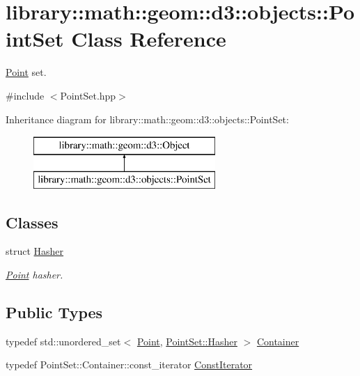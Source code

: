 \hypertarget{classlibrary_1_1math_1_1geom_1_1d3_1_1objects_1_1_point_set}{}\section{library\+:\+:math\+:\+:geom\+:\+:d3\+:\+:objects\+:\+:Point\+Set Class Reference}
\label{classlibrary_1_1math_1_1geom_1_1d3_1_1objects_1_1_point_set}


\hyperlink{classlibrary_1_1math_1_1geom_1_1d3_1_1objects_1_1_point}{Point} set.  




{\ttfamily \#include $<$Point\+Set.\+hpp$>$}

Inheritance diagram for library\+:\+:math\+:\+:geom\+:\+:d3\+:\+:objects\+:\+:Point\+Set\+:\begin{figure}[H]
\begin{center}
\leavevmode
\includegraphics[height=2.000000cm]{classlibrary_1_1math_1_1geom_1_1d3_1_1objects_1_1_point_set}
\end{center}
\end{figure}
\subsection*{Classes}
\begin{DoxyCompactItemize}
\item 
struct \hyperlink{structlibrary_1_1math_1_1geom_1_1d3_1_1objects_1_1_point_set_1_1_hasher}{Hasher}
\begin{DoxyCompactList}\small\item\em \hyperlink{classlibrary_1_1math_1_1geom_1_1d3_1_1objects_1_1_point}{Point} hasher. \end{DoxyCompactList}\end{DoxyCompactItemize}
\subsection*{Public Types}
\begin{DoxyCompactItemize}
\item 
typedef std\+::unordered\+\_\+set$<$ \hyperlink{classlibrary_1_1math_1_1geom_1_1d3_1_1objects_1_1_point}{Point}, \hyperlink{structlibrary_1_1math_1_1geom_1_1d3_1_1objects_1_1_point_set_1_1_hasher}{Point\+Set\+::\+Hasher} $>$ \hyperlink{classlibrary_1_1math_1_1geom_1_1d3_1_1objects_1_1_point_set_ac1aed08551a4cc9556b4b49f88ae35d4}{Container}
\item 
typedef Point\+Set\+::\+Container\+::const\+\_\+iterator \hyperlink{classlibrary_1_1math_1_1geom_1_1d3_1_1objects_1_1_point_set_a7b7fade95484b653ec27ad082ffc8064}{Const\+Iterator}
\end{DoxyCompactItemize}
